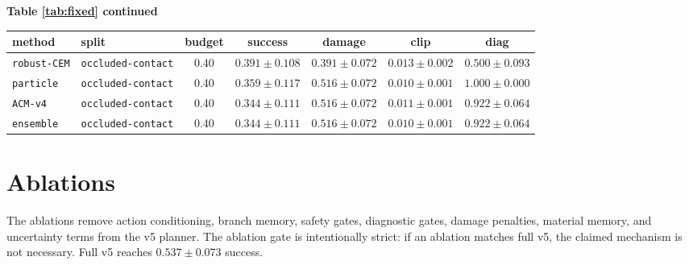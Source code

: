 \documentclass{article}
\begin{document}
\begin{center}
\textbf{Table \ref{tab:fixed} continued}\\[0.4ex]
\begin{tabular}{llccccc}
\toprule
method & split & budget & success & damage & clip & diag \\
\midrule
\texttt{robust-CEM} & \texttt{occluded-contact} & 0.40 & $0.391 \pm 0.108$ & $0.391 \pm 0.072$ & $0.013 \pm 0.002$ & $0.500 \pm 0.093$ \\
\texttt{particle} & \texttt{occluded-contact} & 0.40 & $0.359 \pm 0.117$ & $0.516 \pm 0.072$ & $0.010 \pm 0.001$ & $1.000 \pm 0.000$ \\
\texttt{ACM-v4} & \texttt{occluded-contact} & 0.40 & $0.344 \pm 0.111$ & $0.516 \pm 0.072$ & $0.011 \pm 0.001$ & $0.922 \pm 0.064$ \\
\texttt{ensemble} & \texttt{occluded-contact} & 0.40 & $0.344 \pm 0.111$ & $0.516 \pm 0.072$ & $0.010 \pm 0.001$ & $0.922 \pm 0.064$ \\
\bottomrule
\end{tabular}
\end{center}
\normalsize

\section{Ablations}
The ablations remove action conditioning, branch memory, safety gates, diagnostic gates, damage penalties, material memory, and uncertainty terms from the v5 planner. The ablation gate is intentionally strict: if an ablation matches full v5, the claimed mechanism is not necessary. Full v5 reaches $0.537 \pm 0.073$ success.
\end{document}
